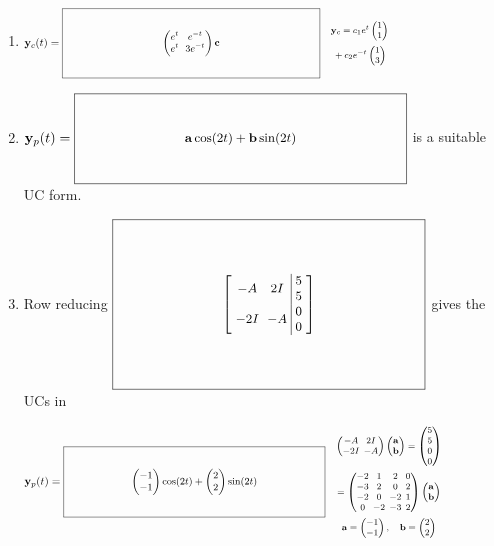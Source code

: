 \documentclass[12pt,letterpaper]{article}
\newcommand{\KeyBox}[3]{\vcenter{\hbox{$\boxed{\parbox[c][#2][c]{#1}{\centering\small\setlength{\arraycolsep}{3pt}\ensuremath{\displaystyle #3}}}$}}}
\newcommand{\KeySide}[2]{\quad\vcenter{\hbox{\parbox{#1}{\footnotesize\setlength{\arraycolsep}{2pt}\ensuremath{\begin{gathered}#2\end{gathered}}}}}}
\begin{document}
\begin{enumerate}
\begin{enumerate}
\item $\vect{y}_c(t)=\KeyBox{3.2in}{0.80in}{\begin{pmatrix}e^t&e^{-t}\\e^t&3e^{-t}\end{pmatrix}\vect{c}}\KeySide{2.5in}{\vect{y}_c=c_1e^t\begin{pmatrix}1\\1\end{pmatrix}\\{}+c_2e^{-t}\begin{pmatrix}1\\3\end{pmatrix}}$
\item $\vect{y}_p(t)=\KeyBox{3.2in}{0.80in}{\vect{a}\cos(2t)+\vect{b}\sin(2t)}$
is a suitable UC form.
\item Row reducing
$\KeyBox{3.0in}{1.60in}{\left[\begin{array}{cc|c}-A&2I&\begin{matrix}5\\5\end{matrix}\\-2I&-A&\begin{matrix}0\\0\end{matrix}\end{array}\right]}$\hspace{0.12in} gives the UCs in
\par
$\vect{y}_p(t)=\KeyBox{3.2in}{0.80in}{\begin{pmatrix}-1\\-1\end{pmatrix}\cos(2t)+\begin{pmatrix}2\\2\end{pmatrix}\sin(2t)}\KeySide{2.4in}{\begin{pmatrix}-A&2I\\-2I&-A\end{pmatrix}\begin{pmatrix}\vect{a}\\\vect{b}\end{pmatrix}=\begin{pmatrix}5\\5\\0\\0\end{pmatrix}\\=\begin{pmatrix}-2&1&2&0\\-3&2&0&2\\-2&0&-2&1\\0&-2&-3&2\end{pmatrix}\begin{pmatrix}\vect{a}\\\vect{b}\end{pmatrix}\\\vect{a}=\begin{pmatrix}-1\\-1\end{pmatrix},\quad\vect{b}=\begin{pmatrix}2\\2\end{pmatrix}}$

\end{enumerate}
\end{enumerate}
\end{document}
